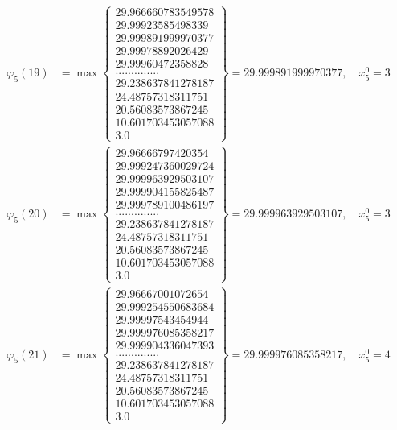 \documentclass{article}
\begin{document}
\begin{align*}
  
  
  
\varphi_{5}(19) &= \max \left\{ \begin{array}{c}
29.966660783549578 \\
 29.99923585498339 \\
 29.999891999970377 \\
 29.99978892026429 \\
 29.99960472358828 \\
 .............. \\
 29.238637841278187 \\
 24.48757318311751 \\
 20.56083573867245 \\
 10.601703453057088 \\
 3.0
\end{array} \right\} = 29.999891999970377, \quad x_{5}^0 = 3\\
  
  
  
  
\varphi_{5}(20) &= \max \left\{ \begin{array}{c}
29.96666797420354 \\
 29.999247360029724 \\
 29.999963929503107 \\
 29.999904155825487 \\
 29.999789100486197 \\
 .............. \\
 29.238637841278187 \\
 24.48757318311751 \\
 20.56083573867245 \\
 10.601703453057088 \\
 3.0
\end{array} \right\} = 29.999963929503107, \quad x_{5}^0 = 3\\
  
  
  
  
\varphi_{5}(21) &= \max \left\{ \begin{array}{c}
29.96667001072654 \\
 29.999254550683684 \\
 29.99997543454944 \\
 29.999976085358217 \\
 29.999904336047393 \\
 .............. \\
 29.238637841278187 \\
 24.48757318311751 \\
 20.56083573867245 \\
 10.601703453057088 \\
 3.0
\end{array} \right\} = 29.999976085358217, \quad x_{5}^0 = 4\\
  

\end{align*}
\end{document}
